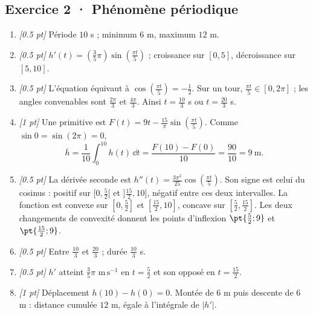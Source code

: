 \subsection*{Exercice 2 · Phénomène périodique}\begin{enumerate}

\item \textit{[\num{0,5} pt]} Période $10$ s ; minimum $6$ m, maximum $12$ m.

\item \textit{[\num{0,5} pt]} $h'(t)=(\frac{3}{5}\pi)\sin (\frac{\pi t}{5})$ ; croissance sur $[0,5]$, décroissance sur $[5,10]$.

\item \textit{[\num{0,5} pt]} L'équation équivaut à $\cos (\frac{\pi t}{5})=-\frac{1}{2}$. Sur un tour, $\frac{\pi t}{5}\in[0,2\pi]$ ; les angles convenables sont $\frac{2\pi}{3}$ et $\frac{4\pi}{3}$. Ainsi $t=\frac{10}{3}$ s ou $t=\frac{20}{3}$ s.

\item \textit{[1 pt]} Une primitive est $F(t)=9t-\frac{15}{\pi}\sin (\frac{\pi t}{5})$. Comme $\sin0=\sin(2\pi)=0$,
\[\overline h=\frac{1}{10}\int_0^{10}h(t)\,\dd t=\frac{F(10)-F(0)}{10}=\frac{90}{10}=9\ \mathrm{m}.\]

\item \textit{[\num{0,5} pt]} La dérivée seconde est $h''(t)=\frac{3\pi^2}{25}\cos (\frac{\pi t}{5})$. Son signe est celui du cosinus : positif sur $[0,\frac{5}{2}[$ et $]\frac{15}{2},10]$, négatif entre ces deux intervalles. La fonction est convexe sur $[0,\frac{5}{2}]$ et $[\frac{15}{2},10]$, concave sur $[\frac{5}{2},\frac{15}{2}]$. Les deux changements de convexité donnent les points d'inflexion $\pt{\frac{5}{2};9}$ et $\pt{\frac{15}{2};9}$.

\item \textit{[\num{0,5} pt]} Entre $\frac{10}{3}$ et $\frac{20}{3}$ ; durée $\frac{10}{3}$ s.

\item \textit{[\num{0,5} pt]} $h'$ atteint $\frac{3}{5}\pi$ $\mathrm{m\,s^{-1}}$ en $t=\frac{5}{2}$ et son opposé en $t=\frac{15}{2}$.

\item \textit{[1 pt]} Déplacement $h(10)-h(0)=0$. Montée de $6$ m puis descente de $6$ m : distance cumulée $12$ m, égale à l'intégrale de $|h'|$.

\end{enumerate}

